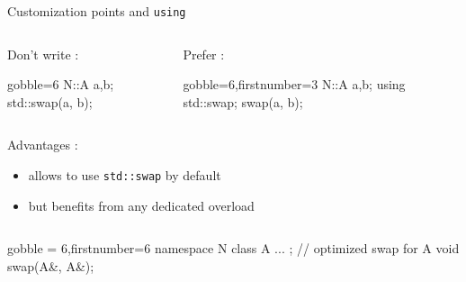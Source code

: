 \begin{frame}[fragile]
  \begin{block}{Customization points and \texttt{using}}
    \begin{columns}[t]
      \begin{column}{.35\textwidth}
        Don't write :
        \begin{cppcode*}{gobble=6}
          N::A a,b;
          std::swap(a, b);
        \end{cppcode*}
      \end{column}
      \begin{column}{.35\textwidth}
        Prefer :
        \begin{cppcode*}{gobble=6,firstnumber=3}
          N::A a,b;
          using std::swap;
          swap(a, b);
        \end{cppcode*}
      \end{column}
    \end{columns}
    \vspace{.2cm}
    Advantages :
    \begin{itemize}
    \item allows to use \texttt{std::swap} by default
    \item but benefits from any dedicated overload
    \end{itemize}
    \begin{columns}
      \begin{column}{.7\textwidth}
        \begin{cppcode*}{gobble = 6,firstnumber=6}
          namespace N {
            class A { ... };
            // optimized swap for A
            void swap(A&, A&);
          }
        \end{cppcode*}
      \end{column}
    \end{columns}
  \end{block}
\end{frame}

